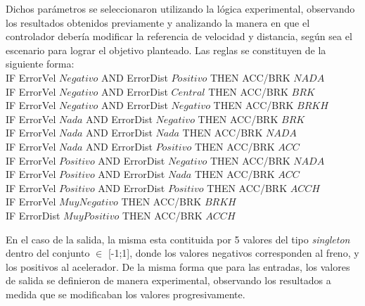 \par Dichos parámetros se seleccionaron utilizando la lógica experimental, observando los resultados obtenidos previamente y analizando la manera en que el controlador debería modificar la referencia de velocidad y distancia, según sea el escenario para lograr el objetivo planteado. Las reglas se constituyen de la siguiente forma:\\

	\hspace*{2pt}IF ErrorVel $Negativo$ AND ErrorDist $Positivo$ THEN ACC/BRK $NADA$\\
	\hspace*{20pt}IF ErrorVel $Negativo$ AND ErrorDist $Central$ THEN ACC/BRK $BRK$\\
	\hspace*{20pt}IF ErrorVel $Negativo$ AND ErrorDist $Negativo$ THEN ACC/BRK $BRKH$\\
	\hspace*{20pt}IF ErrorVel $Nada$ AND ErrorDist $Negativo$ THEN ACC/BRK $BRK$\\
	\hspace*{20pt}IF ErrorVel $Nada$ AND ErrorDist $Nada$ THEN ACC/BRK $NADA$\\
	\hspace*{20pt}IF ErrorVel $Nada$ AND ErrorDist $Positivo$ THEN ACC/BRK $ACC$\\
	\hspace*{20pt}IF ErrorVel $Positivo$ AND ErrorDist $Negativo$ THEN ACC/BRK $NADA$\\
	\hspace*{20pt}IF ErrorVel $Positivo$ AND ErrorDist $Nada$ THEN ACC/BRK $ACC$\\
	\hspace*{20pt}IF ErrorVel $Positivo$ AND ErrorDist $Positivo$ THEN ACC/BRK $ACCH$\\
	\hspace*{20pt}IF ErrorVel $MuyNegativo$ THEN ACC/BRK $BRKH$\\
	\hspace*{20pt}IF ErrorDist $MuyPositivo$ THEN ACC/BRK $ACCH$\\

\par En el caso de la salida, la misma esta contituida por 5 valores del tipo \textit{singleton} dentro del conjunto $\in$ [-1;1], donde los valores negativos corresponden al freno, y los positivos al acelerador. De la misma forma que para las entradas, los valores de salida se definieron de manera experimental, observando los resultados a medida que se modificaban los valores progresivamente.\\

